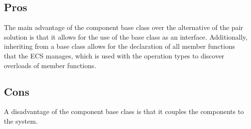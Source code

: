 \subsection{Pros}
The main advantage of the component base class over the alternative of the pair solution is that it allows for the use of the base class as an interface.
Additionally, inheriting from a base class allows for the declaration of all member functions that the ECS manages, which is used with the operation types to discover overloads of member functions.

\subsection{Cons}
A disadvantage of the component base class is that it couples the components to the system.
